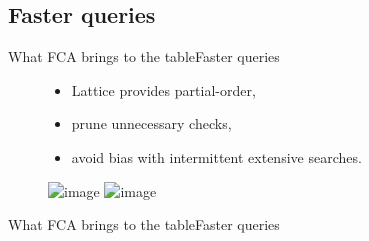 \subsection{Faster queries}
\begin{frame}{What FCA brings to the table}{Faster queries}

\begin{figure}[ht]
  \begin{minipage}[t]{0.52\linewidth}
    \vspace{0pt}
      \begin{itemize}
      \item Lattice provides partial-order,
      \item prune unnecessary checks,
      \item<2> avoid bias with intermittent extensive searches.
      \end{itemize}
  \end{minipage}
  \hfill
  \begin{minipage}[t]{0.45\linewidth}
    \vspace{0pt}
    \centering
    \includegraphics<1-1>[width=\textwidth]{img/fca/hierarchy1}	
    \includegraphics<2-2>[width=\textwidth]{img/fca/hierarchy2}		
  \end{minipage}
\end{figure}

\end{frame}

\begin{frame}{What FCA brings to the table}{Faster queries}
\end{frame}


%
